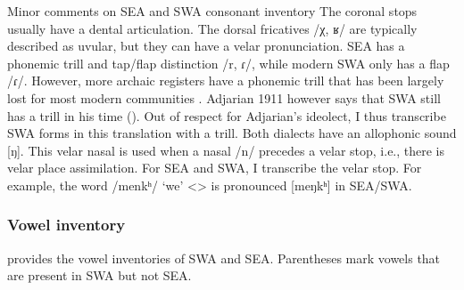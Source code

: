 \documentclass[output=paper]{langscibook}
\begin{document}
\ea Minor comments on SEA and SWA consonant inventory 
	\ea The coronal stops usually have a dental articulation. 
	\ex The dorsal fricatives /χ, ʁ/ are typically described as uvular, but they can have a velar pronunciation. 
	\ex SEA has a phonemic trill and tap/flap distinction /r, ɾ/, while modern SWA only has a flap /ɾ/. However, more archaic registers have a phonemic trill that has been largely lost for most modern communities \citep{Tahtadjian-2020-WesterArmenianRhoticDifferentialPhoneticStudy}. Adjarian 1911 however says that SWA still has a trill in his time ().  Out of respect for Adjarian's ideolect, I thus transcribe SWA forms in this translation with a trill. 
	\ex Both dialects have an allophonic sound [ŋ]. This velar nasal is used when a nasal /n/ precedes a velar stop, i.e., there is velar place assimilation. For SEA and SWA, I transcribe the velar stop. For example, the word /menkʰ/ `we' <> is pronounced [meŋkʰ] in SEA/SWA.  
	\z
\z

\subsubsection{Vowel inventory}\label{sec:HossepIntro:phonotransc:modern:vowe}
 provides the vowel inventories of SWA and SEA. Parentheses mark vowels that are present in SWA but not SEA. 
\end{document}
